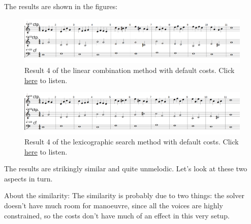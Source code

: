 The results are shown in the figures:

\begin{figure}[h]
    \centering
    \includegraphics[width=1\textwidth]{Images/Experiments/linear-combination-2sp.png}
    \caption{Result 4 of the linear combination method with default costs. Click \href{https://youtu.be/eunaKHOQ2Nk}{here} to listen.}
    \label{fig:combili-2sp}
\end{figure}

\begin{figure}[h]
    \centering
    \includegraphics[width=1\textwidth]{Images/Experiments/basic-lexico-2sp.png}
    \caption{Result 4 of the lexicographic search method with default costs. Click \href{https://youtu.be/rh3YdRu62J4}{here} to listen.}
    \label{fig:lexico-2sp}
\end{figure}

The results are strikingly similar and quite unmelodic. Let's look at these two aspects in turn.

About the similarity: The similarity is probably due to two things: the solver doesn't have much room for manoeuvre, since all the voices are highly constrained, so the costs don't have much of an effect in this very setup. 

